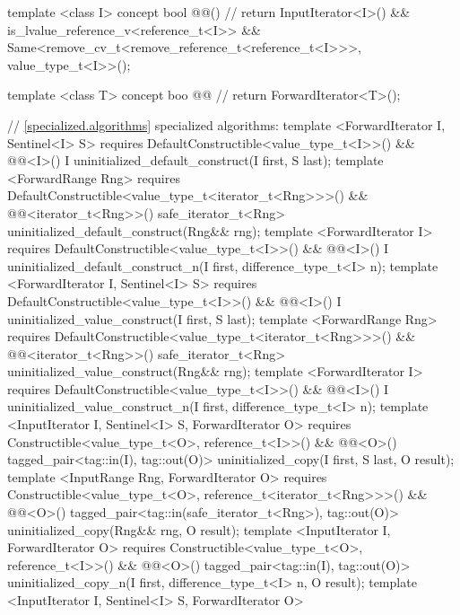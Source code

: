 {\color{addclr}
\begin{codeblock}
template <class I>
concept bool @@() { // \expos
  return InputIterator<I>() &&
    is_lvalue_reference_v<reference_t<I>> &&
    Same<remove_cv_t<remove_reference_t<reference_t<I>>>, value_type_t<I>>();
}

template <class T>
concept boo @@ { // \expos
   return ForwardIterator<T>();
}

// \ref{specialized.algorithms} specialized algorithms:
template <ForwardIterator I, Sentinel<I> S>
  requires DefaultConstructible<value_type_t<I>>() &&
           @@<I>()
    I uninitialized_default_construct(I first, S last);
template <ForwardRange Rng>
  requires DefaultConstructible<value_type_t<iterator_t<Rng>>>() &&
           @@<iterator_t<Rng>>()
    safe_iterator_t<Rng>
    uninitialized_default_construct(Rng&& rng);
template <ForwardIterator I>
  requires DefaultConstructible<value_type_t<I>>() &&
           @@<I>()
    I uninitialized_default_construct_n(I first, difference_type_t<I> n);
template <ForwardIterator I, Sentinel<I> S>
  requires DefaultConstructible<value_type_t<I>>() &&
           @@<I>()
    I uninitialized_value_construct(I first, S last);
template <ForwardRange Rng>
  requires DefaultConstructible<value_type_t<iterator_t<Rng>>>() &&
           @@<iterator_t<Rng>>()
    safe_iterator_t<Rng>
    uninitialized_value_construct(Rng&& rng);
template <ForwardIterator I>
  requires DefaultConstructible<value_type_t<I>>() &&
           @@<I>()
    I uninitialized_value_construct_n(I first, difference_type_t<I> n);
template <InputIterator I, Sentinel<I> S, ForwardIterator O>
  requires Constructible<value_type_t<O>, reference_t<I>>() &&
           @@<O>()
    tagged_pair<tag::in(I), tag::out(O)>
    uninitialized_copy(I first, S last, O result);
template <InputRange Rng, ForwardIterator O>
  requires Constructible<value_type_t<O>, reference_t<iterator_t<Rng>>>() &&
           @@<O>()
    tagged_pair<tag::in(safe_iterator_t<Rng>), tag::out(O)>
    uninitialized_copy(Rng&& rng, O result);
template <InputIterator I, ForwardIterator O>
  requires Constructible<value_type_t<O>, reference_t<I>>() &&
           @@<O>()
    tagged_pair<tag::in(I), tag::out(O)>
    uninitialized_copy_n(I first, difference_type_t<I> n, O result);
template <InputIterator I, Sentinel<I> S, ForwardIterator O>

\end{codeblock}}
